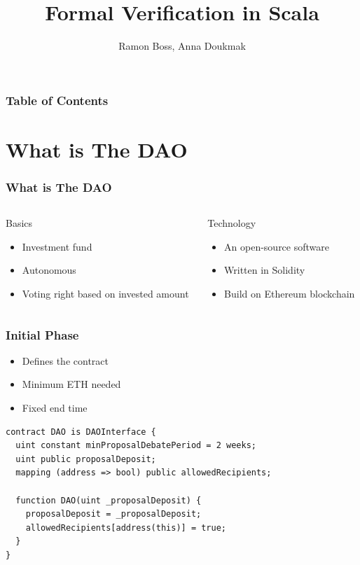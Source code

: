 \documentclass{beamer}
\begin{document}
\title{Formal Verification in Scala}
\author{Ramon Boss, Anna Doukmak}

\frame{\titlepage}

\begin{frame}
  \frametitle{Table of Contents}
  \tableofcontents
\end{frame}

\section{What is The DAO}

\begin{frame}
\frametitle{What is The DAO}
\begin{columns}
  \begin{column}{0.5\textwidth}
  Basics
  \begin{itemize}
    \item Investment fund
    \item Autonomous
    \item Voting right based on invested amount
  \end{itemize}
  \end{column}
  \pause
  \begin{column}{0.5\textwidth}
    Technology
    \begin{itemize}
      \item An open-source software
      \item Written in Solidity
      \item Build on Ethereum blockchain
    \end{itemize}
  \end{column}
\end{columns}
\end{frame}


\begin{frame}[fragile]
\frametitle{Initial Phase}
\begin{itemize}
  \item Defines the contract
  \item Minimum ETH needed
  \item Fixed end time
\end{itemize}
\pause
\begin{lstlisting}[language=Solidity]
contract DAO is DAOInterface {
  uint constant minProposalDebatePeriod = 2 weeks;
  uint public proposalDeposit;
  mapping (address => bool) public allowedRecipients;

  function DAO(uint _proposalDeposit) {
    proposalDeposit = _proposalDeposit;
    allowedRecipients[address(this)] = true;
  }
}
\end{lstlisting}
\end{frame}
\end{document}
